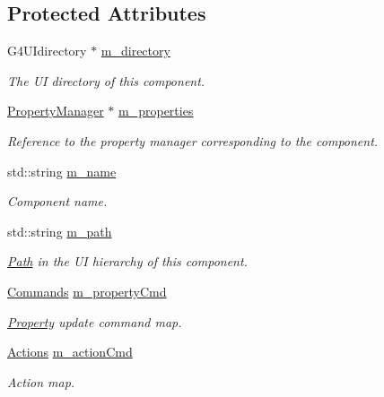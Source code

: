 \subsection*{Protected Attributes}
\begin{DoxyCompactItemize}
\item 
G4UIdirectory $\ast$ \hyperlink{class_d_d4hep_1_1_simulation_1_1_geant4_u_i_messenger_a6774d3061088d7b9391770e8dc74385e}{m\_\-directory}
\begin{DoxyCompactList}\small\item\em The UI directory of this component. \item\end{DoxyCompactList}\item 
\hyperlink{class_d_d4hep_1_1_property_manager}{PropertyManager} $\ast$ \hyperlink{class_d_d4hep_1_1_simulation_1_1_geant4_u_i_messenger_a6be8711d442a1d0031c83f9a5300f1eb}{m\_\-properties}
\begin{DoxyCompactList}\small\item\em Reference to the property manager corresponding to the component. \item\end{DoxyCompactList}\item 
std::string \hyperlink{class_d_d4hep_1_1_simulation_1_1_geant4_u_i_messenger_ab6322440ddac03e9b62f5560c7d11dbf}{m\_\-name}
\begin{DoxyCompactList}\small\item\em Component name. \item\end{DoxyCompactList}\item 
std::string \hyperlink{class_d_d4hep_1_1_simulation_1_1_geant4_u_i_messenger_a8b314ffb2df2f6268eb13abdad35c1dc}{m\_\-path}
\begin{DoxyCompactList}\small\item\em \hyperlink{class_d_d4hep_1_1_path}{Path} in the UI hierarchy of this component. \item\end{DoxyCompactList}\item 
\hyperlink{class_d_d4hep_1_1_simulation_1_1_geant4_u_i_messenger_a07e66059e5542ef6c393fda188f44907}{Commands} \hyperlink{class_d_d4hep_1_1_simulation_1_1_geant4_u_i_messenger_a79be5ed431c95728e21ba8119138dff0}{m\_\-propertyCmd}
\begin{DoxyCompactList}\small\item\em \hyperlink{class_d_d4hep_1_1_property}{Property} update command map. \item\end{DoxyCompactList}\item 
\hyperlink{class_d_d4hep_1_1_simulation_1_1_geant4_u_i_messenger_a91b01eab1bb56af8661d2c99660211cd}{Actions} \hyperlink{class_d_d4hep_1_1_simulation_1_1_geant4_u_i_messenger_afb818b60e55fd0ccd83ec5f7b78eb82c}{m\_\-actionCmd}
\begin{DoxyCompactList}\small\item\em Action map. \item\end{DoxyCompactList}\end{DoxyCompactItemize}



